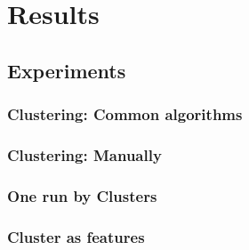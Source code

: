 \chapter{Results}

\section{Experiments}

\subsection{Clustering: Common algorithms}

\subsection{Clustering: Manually}

\subsection{One run by Clusters}

\subsection{Cluster as features}